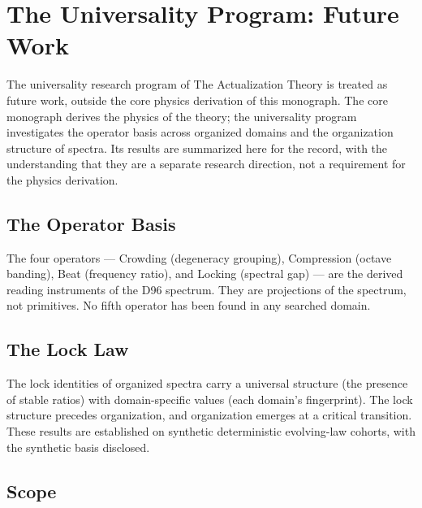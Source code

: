 
\chapter{The Universality Program: Future Work}
\label{app:app:app:universality}

The universality research program of The Actualization Theory is treated as future work, outside
the core physics derivation of this monograph. The core monograph derives the physics of the
theory; the universality program investigates the operator basis across organized domains
and the organization structure of spectra. Its results are summarized here for the record,
with the understanding that they are a separate research direction, not a requirement for
the physics derivation.

\section{The Operator Basis}
\label{app:app:app:operators}

The four operators --- Crowding (degeneracy grouping), Compression (octave banding), Beat
(frequency ratio), and Locking (spectral gap) --- are the derived reading instruments of the
D96 spectrum. They are projections of the spectrum, not primitives. No fifth operator has
been found in any searched domain.

\section{The Lock Law}
\label{app:app:app:lock-law}

The lock identities of organized spectra carry a universal structure (the presence of stable
ratios) with domain-specific values (each domain's fingerprint). The lock structure
precedes organization, and organization emerges at a critical transition. These results are
established on synthetic deterministic evolving-law cohorts, with the synthetic basis
disclosed.

\section{Scope}
\label{app:app:app:universality-scope}


